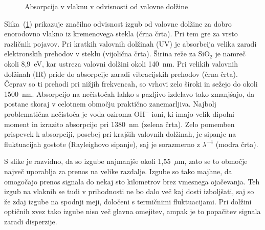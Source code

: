 \begin{figure}[h]
\centering
\def\svgwidth{90truemm} 
 
\caption{Absorpcija v vlaknu v odvisnosti od valovne dolžine}
\label{FibAbs}
\end{figure}
Slika~(\ref{FibAbs}) prikazuje značilno odvisnost izgub od valovne dolžine 
za dobro enorodovno vlakno iz kremenovega stekla (črna črta). Pri tem gre 
za vrsto različnih pojavov. 
Pri kratkih valovnih dolžinah (UV) je absorbcija velika zaradi elektronskih prehodov
v steklu (vijolična črta). Širina reže za SiO$_2$ je namreč okoli 8,9~eV, kar ustreza valovni dolžini
okoli 140~nm. Pri velikih valovnih dolžinah (IR) pride do absorpcije zaradi
vibracijskih prehodov (črna črta). Čeprav so ti prehodi pri nižjih frekvencah, 
so vrhovi zelo široki in sežejo do okoli 1500~nm. Absorpcijo na nečistočah lahko s pazljivo 
izdelavo tako zmanjšajo, da postane skoraj v celotnem območju praktično zanemarljiva. 
Najbolj problematična nečistoča je voda oziroma OH$^{-}$ ioni, ki imajo velik dipolni
moment in izrazito absorpcijo pri 1380~nm (zelena črta). Zelo pomemben prispevek k 
absorpciji, posebej pri krajših valovnih dolžinah, je sipanje na fluktuacijah 
gostote (Rayleighovo sipanje), saj je sorazmerno z $\lambda^{-4}$ (modra črta). 

S slike je razvidno, da so izgube najmanjše
okoli 1,55~$\mu$m, zato se to območje največ uporablja za prenos
na velike razdalje. Izgube so tako majhne, da omogočajo prenos signala 
do nekaj sto kilometrov brez vmesnega ojačevanja. Teh izgub na vlaknih se tudi v prihodnosti 
ne bo dalo več kaj dosti izboljšati, saj so že zdaj izgube na spodnji meji,
določeni s termičnimi fluktuacijami. Pri dolžini optičnih zvez tako izgube niso več glavna
omejitev, ampak je to popačitev signala zaradi disperzije.


